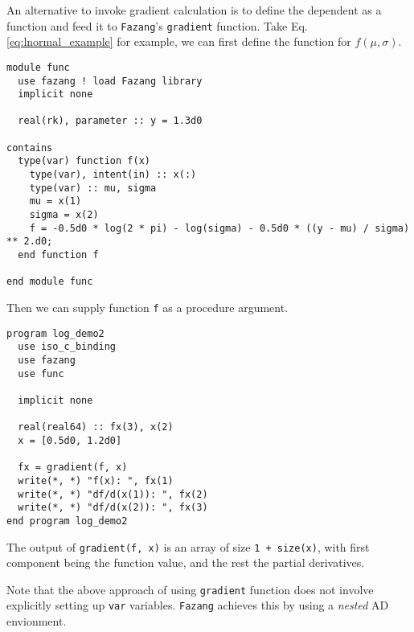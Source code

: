 \documentclass[12pt, reqno, oneside]{amsbook}
\numberwithin{equation}{chapter}
\begin{document}
An alternative to invoke gradient calculation is to define the
dependent as a function and feed it to \texttt{Fazang}'s \texttt{gradient}
function. Take Eq.\eqref{eq:lnormal_example} for example, we can first
define the function for \(f(\mu, \sigma)\).
\begin{verbatim}
module func
  use fazang ! load Fazang library
  implicit none

  real(rk), parameter :: y = 1.3d0

contains
  type(var) function f(x)
    type(var), intent(in) :: x(:)
    type(var) :: mu, sigma
    mu = x(1)
    sigma = x(2)
    f = -0.5d0 * log(2 * pi) - log(sigma) - 0.5d0 * ((y - mu) / sigma) ** 2.d0;
  end function f

end module func
\end{verbatim}
Then we can supply function \texttt{f} as a procedure argument.
\begin{verbatim}
program log_demo2
  use iso_c_binding
  use fazang
  use func

  implicit none

  real(real64) :: fx(3), x(2)
  x = [0.5d0, 1.2d0]

  fx = gradient(f, x)
  write(*, *) "f(x): ", fx(1)
  write(*, *) "df/d(x(1)): ", fx(2)
  write(*, *) "df/d(x(2)): ", fx(3)
end program log_demo2
\end{verbatim}
The output of \texttt{gradient(f, x)} is an array of size \texttt{1 + size(x)}, with
first component being the function value, and the rest the partial
derivatives.

Note that the above approach of using \texttt{gradient} function does not
involve explicitly setting up \texttt{var} variables. \texttt{Fazang} achieves this
by using a \emph{nested} AD envionment.
\end{document}
